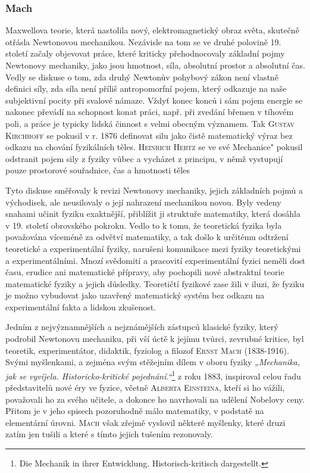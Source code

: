       \subsubsection{Mach}
        Maxwellova teorie, která nastolila nový, elektromagnetický obraz světa, skutečně otřásla
        Newtonovou mechanikou. Nezávisle na tom se ve druhé polovině 19. století začaly objevovat
        práce, které kriticky přehodnocovaly základní pojmy Newtonovy mechaniky, jako jsou hmotnost,
        síla, absolutní prostor a absolutní čas. Vedly se diskuse o tom, zda druhý Newtonův pohybový
        zákon není vlastně definici síly, zda síla není příliš antropomorfní pojem, který odkazuje
        na naše subjektivní pocity při svalové námaze. Vždyť konec konců i sám pojem energie se
        nakonec převádí na schopnost konat práci, např. při zvedání břemen v tíhovém poli, a práce
        je typicky lidská činnost s velmi obecným významem. Tak \textsc{Gustav Kirchhoff} se pokusil
        v r. 1876 definovat silu jako čistě matematický výraz bez odkazu na chování fyzikálních
        těles. \textsc{Heinrich Hertz} se ve své Mechanice" pokusil odstranit pojem sily z fyziky
        vůbec a vycházet z principu, v němž vystupují pouze prostorové souřadnice, čas a hmotnosti
        těles

        Tyto diskuse směřovaly k revizi Newtonovy mechaniky, jejich základních pojmů a východisek,
        ale neusilovaly o její nahrazení mechanikou novou. Byly vedeny snahami učinit fyziku
        exaktnější, přiblížit ji struktuře matematiky, která dosáhla v 19. století obrovského
        pokroku. Vedlo to k tomu, že teoretická fyzika byla považována víceméně za odvětví
        matematiky, a tak došlo k určitému odtržení teoretické a experimentální fyziky, narušeni
        komunikace mezi fyziky teoretickými a experimentálními. Mnozí svědomití a pracovití
        experimentální fyzici neměli dost času, erudice ani matematické přípravy, aby pochopili nové
        abstraktní teorie matematické fyziky a jejich důsledky. Teoretičtí fyzikové zase žili v
        iluzi, že fyziku je možno vybudovat jako uzavřený matematický systém bez odkazu na
        experimentální fakta a lidskou zkušenost.

        Jedním z nejvýznamnějších a nejznámějších zástupců klasické fyziky, který podrobil Newtonovu
        mechaniku, při vší úctě k jejímu tvůrci, zevrubné kritice, byl teoretik, experimentátor,
        didaktik, fyziolog a filozof \textsc{Ernst Mach} (1838-1916). Svými myšlenkami, a zejména
        svým stěžejním dílem v oboru fyziky \emph{„Mechanika, jak se vyvíjela. Historicko-kritické
        pojednání.“}\footnote{Die Mechanik in ihrer Entwicklung. Historisch-kritisch dargestellt.} z
        roku 1883, inspiroval celou řadu představitelů nové éry ve fyzice, včetně \textsc{Alberta
        Einsteina}, kteří si ho vážili, považovali ho za svého učitele, a dokonce ho navrhovali na
        udělení Nobelovy ceny. Přitom je v jeho spisech pozoruhodně málo matematiky, v podstatě na
        elementární úrovni. \textsc{Mach} však zřejmě vyslovil některé myšlenky, které druzi zatím
        jen tušili a které s tímto jejich tušením rezonovaly.

